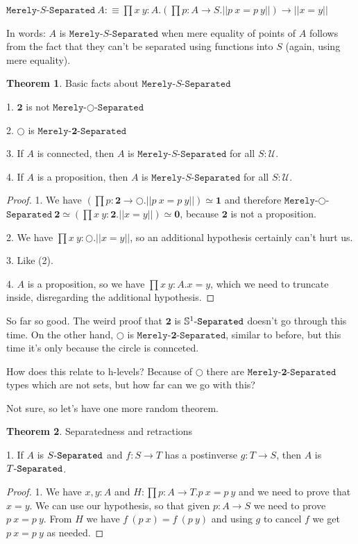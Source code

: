 \documentclass[11pt]{article}
\theoremstyle{definition}
\newtheorem{theorem}{Theorem}[section]
\newcommand{\txt}[1]{\texttt{#1}}
\renewcommand{\(}{\left(}
\renewcommand{\)}{\right)}
\newcommand{\defn}{:\equiv}
\newcommand{\U}{\mathcal{U}}
\newcommand{\apl}[2]{#1\ #2}
\newcommand{\hequiv}[2]{#1 \simeq #2}
\newcommand{\Empty}{\mathbf{0}}
\newcommand{\Unit}{\mathbf{1}}
\newcommand{\Bool}{\mathbf{2}}
\newcommand{\dprod}[2]{\prod #1.#2}
\newcommand{\trf}[1]{||#1||}
\begin{document}
\newcommand{\MS}[1]{\txt{Merely}$-$#1$-$\txt{Separated}}
$\displaystyle \apl{\MS{S}}{A} \defn \dprod{x\ y : A}{\(\dprod{p : A \to S}{\trf{\apl{p}{x} = \apl{p}{y}}}\) \to \trf{x = y}}$

In words: $A$ is $\MS{S}$ when mere equality of points of $A$ follows from the fact that they can't be separated using functions into $S$ (again, using mere equality).

\renewcommand{\hequiv}{\simeq}
\begin{theorem} Basic facts about $\MS{S}$

1. $\Bool$ is not $\MS{\Circle}$

2. $\Circle$ is $\MS{\Bool}$

3. If $A$ is connected, then $A$ is $\MS{S}$ for all $S : \U$.

4. If $A$ is a proposition, then $A$ is $\MS{S}$ for all $S : \U$.

\end{theorem}
\begin{proof}

1. We have $\(\dprod{p : \Bool \to \Circle}{\trf{\apl{p}{x} = \apl{p}{y}}}\) \hequiv \Unit$ and therefore $\apl{\MS{\Circle}}{\Bool} \hequiv \(\dprod{x\ y : \Bool}{\trf{x = y}}\) \hequiv \Empty$, because $\Bool$ is not a proposition.

2. We have $\dprod{x\ y : \Circle}{\trf{x = y}}$, so an additional hypothesis certainly can't hurt us.

3. Like (2).

4. $A$ is a proposition, so we have $\dprod{x\ y : A}{x = y}$, which we need to truncate inside, disregarding the additional hypothesis.

\end{proof}

So far so good. The weird proof that $\Bool$ is $\Separated{\Circle}$ doesn't go through this time. On the other hand, $\Circle$ is $\MS{\Bool}$, similar to before, but this time it's only because the circle is connceted.

How does this relate to h-levels? Because of $\Circle$ there are $\MS{\Bool}$ types which are not sets, but how far can we go with this?

Not sure, so let's have one more random theorem.

\begin{theorem} Separatedness and retractions

1. If $A$ is $\Separated{S}$ and $f: S \to T$ has a postinverse $g : T \to S$, then $A$ is $\Separated{T}$.

\end{theorem}
\begin{proof}

1. We have $x, y : A$ and $H : \dprod{p : A \to T}{\apl{p}{x} = \apl{p}{y}}$ and we need to prove that $x = y$. We can use our hypothesis, so that given $p : A \to S$ we need to prove $\apl{p}{x} = \apl{p}{y}$. From $H$ we have $\apl{f}{(\apl{p}{x})} = \apl{f}{(\apl{p}{y})}$ and using $g$ to cancel $f$ we get $\apl{p}{x} = \apl{p}{y}$ as needed.

\end{proof}
\end{document}
